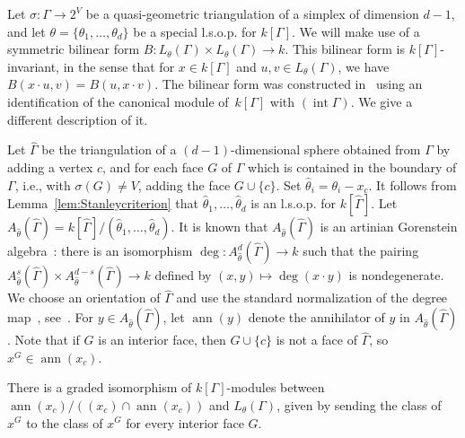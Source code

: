 Let $\sigma \colon \Gamma \to 2^V$ be a quasi-geometric triangulation of a simplex of dimension $d-1$, and let $\theta = \{ \theta_1, \dotsc, \theta_d \}$ be a special l.s.o.p. for $k[\Gamma]$.
We will make use of a symmetric 
bilinear form $B \colon L_{\theta}(\Gamma) \times L_{\theta}(\Gamma) \to k$. This bilinear form is $k[\Gamma]$-invariant, in the sense that for $x \in k[\Gamma]$ and $u, v \in L_{\theta}(\Gamma)$, we have $B(x\cdot u, v) = B(u, x \cdot v)$. The bilinear form was constructed in~\cite[Corollary 4.19]{Stanleylocalh} using an identification of the canonical module of~$k[\Gamma]$ with $(\operatorname{int} \Gamma)$. 
We give a different description of it. 

Let $\hat{\Gamma}$ be the triangulation of a $(d-1)$-dimensional sphere obtained from $\Gamma$ by adding a vertex $c$, and for each face $G$ of $\Gamma$ which is  contained in the boundary of $\Gamma$, i.e., with $\sigma(G) \neq V$, adding the face $G \cup \{c\}$. Set $\hat{\theta}_i = \theta_i - x_c$. 
It follows from Lemma~\ref{lem:Stanleycriterion} 
that $\hat{\theta}_1, \dotsc, \hat{\theta}_d$ is an l.s.o.p. for $k[\hat{\Gamma}]$. 
Let $A_{\hat{\theta}}(\hat{\Gamma}) = 
k[\hat{\Gamma}]/(\hat{\theta}_1, \dotsc, \hat{\theta}_d)$. 
It is known that $A_{\hat{\theta}}(\hat{\Gamma})$ is an artinian Gorenstein algebra~\cite[pg. 65]{Stanleybook}: there is an isomorphism $\deg \colon A_{\hat{\theta}}^{d}(\hat{\Gamma}) \to k$ such that the pairing
$A_{\hat{\theta}}^{s}(\hat{\Gamma}) \times  A_{\hat{\theta}}^{d - s}(\hat{\Gamma}) \to k$ defined by
$(x, y) \mapsto \deg(x \cdot y)$ is nondegenerate. We choose an orientation of $\hat{\Gamma}$ and use the standard normalization of the degree map~\cite{BrionStructurePolytopeAlgebra}, see~\cite[Section 2.5]{KaruXiao}.
For $y \in A_{\hat{\theta}}(\hat{\Gamma})$, let $\operatorname{ann}(y)$ denote the annihilator of $y$ in $A_{\hat{\theta}}(\hat{\Gamma})$. Note that if $G$ is an interior face,  then $G \cup \{c\}$ is not a face of $\hat{\Gamma}$, so $x^G \in \operatorname{ann}(x_c)$.

\begin{lemm}\label{lem:annlocalface}
There is a graded isomorphism of $k[\Gamma]$-modules between $\operatorname{ann}(x_c)/((x_c) \cap \operatorname{ann}(x_c))$ and $L_{\theta}(\Gamma)$, given by sending the class of $x^G$ to the class of $x^G$ for every interior face $G$. 
\end{lemm}

